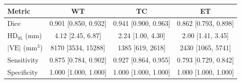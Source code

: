 \begin{tabular}{l c c c}
\toprule
Metric & WT & TC & ET \\
\midrule
Dice & 0.901 [0.850, 0.932] & 0.941 [0.900, 0.963] & 0.862 [0.793, 0.898] \\
HD$_{95}$ (mm) & 4.12 [2.45, 6.87] & 2.24 [1.00, 4.30] & 2.00 [1.41, 3.45] \\
$|\mathrm{VE}|$ (mm$^3$) & 8170 [3534, 15288] & 1385 [619, 2618] & 2430 [1065, 5741] \\
Sensitivity & 0.875 [0.784, 0.902] & 0.927 [0.864, 0.955] & 0.793 [0.729, 0.842] \\
Specificity & 1.000 [1.000, 1.000] & 1.000 [1.000, 1.000] & 1.000 [1.000, 1.000] \\
\bottomrule
\end{tabular}
